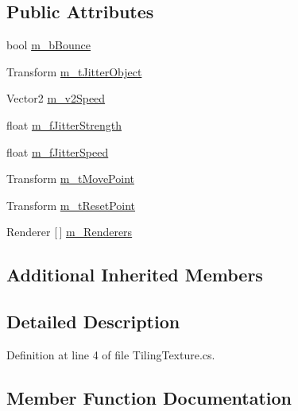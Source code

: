 \subsection*{Public Attributes}
\begin{DoxyCompactItemize}
\item 
bool \mbox{\hyperlink{class_tiling_texture_ab58de252e70556f46570b86c7783a720}{m\+\_\+b\+Bounce}}
\item 
Transform \mbox{\hyperlink{class_tiling_texture_a3a5b653459757fc7755c3ca50305b13c}{m\+\_\+t\+Jitter\+Object}}
\item 
Vector2 \mbox{\hyperlink{class_tiling_texture_a093bf504d7a76e6bc05438e7e382932e}{m\+\_\+v2\+Speed}}
\item 
float \mbox{\hyperlink{class_tiling_texture_a18d7cb0df57f58bdb908ef507fa45c46}{m\+\_\+f\+Jitter\+Strength}}
\item 
float \mbox{\hyperlink{class_tiling_texture_a0ace0874e29a456e46c49756d9591d55}{m\+\_\+f\+Jitter\+Speed}}
\item 
Transform \mbox{\hyperlink{class_tiling_texture_af275872071d81305f2f42b7659eedc39}{m\+\_\+t\+Move\+Point}}
\item 
Transform \mbox{\hyperlink{class_tiling_texture_a550f41df90224c5b8308d8f80460be24}{m\+\_\+t\+Reset\+Point}}
\item 
Renderer \mbox{[}$\,$\mbox{]} \mbox{\hyperlink{class_tiling_texture_ada64712f19863d0cdccb4521774121e9}{m\+\_\+\+Renderers}}
\end{DoxyCompactItemize}
\subsection*{Additional Inherited Members}


\subsection{Detailed Description}


Definition at line 4 of file Tiling\+Texture.\+cs.



\subsection{Member Function Documentation}
\mbox{\label{class_tiling_texture_ad2e8292d65a205d9a05c1cc38f23ec6e}} 
